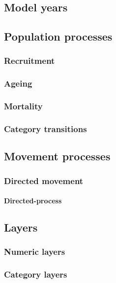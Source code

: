 \subsection{Model years}

\subsection{Population processes}

\subsubsection{Recruitment}

\subsubsection{Ageing}

\subsubsection{Mortality}

\subsubsection{Category transitions}

\subsection{Movement processes}

\subsubsection{Directed movement}

\paragraph{Directed-process}

\subsection{Layers}

\subsubsection{Numeric layers}

\subsubsection{Category layers}

